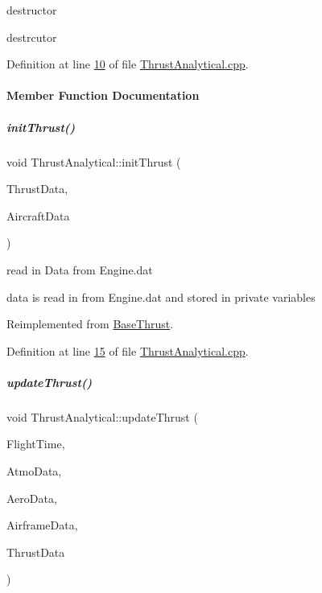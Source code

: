 destructor 

destrcutor 

Definition at line \hyperlink{_thrust_analytical_8cpp_source_l00010}{10} of file \hyperlink{_thrust_analytical_8cpp_source}{Thrust\+Analytical.\+cpp}.



\paragraph{Member Function Documentation}
\mbox{\label{group___engine_a5eb762aee5e5823fa34b2236d9b21134}} 
\subparagraph{\texorpdfstring{init\+Thrust()}{initThrust()}}
{\footnotesize\ttfamily void Thrust\+Analytical\+::init\+Thrust (\begin{DoxyParamCaption}\item[{Thrust\+Struct \&}]{Thrust\+Data,  }\item[{Aircraft\+Struct \&}]{Aircraft\+Data }\end{DoxyParamCaption})\hspace{0.3cm}{\ttfamily [virtual]}}



read in Data from Engine.\+dat 

data is read in from Engine.\+dat and stored in private variables 

Reimplemented from \hyperlink{group___engine_a02b3fe7f763d84c5d34b59f124eaf455}{Base\+Thrust}.



Definition at line \hyperlink{_thrust_analytical_8cpp_source_l00015}{15} of file \hyperlink{_thrust_analytical_8cpp_source}{Thrust\+Analytical.\+cpp}.

\mbox{\label{group___engine_a3907d6febaf711a225c0abfe8022304f}} 
\subparagraph{\texorpdfstring{update\+Thrust()}{updateThrust()}}
{\footnotesize\ttfamily void Thrust\+Analytical\+::update\+Thrust (\begin{DoxyParamCaption}\item[{\hyperlink{group___tools_ga3f1431cb9f76da10f59246d1d743dc2c}{Float64}}]{Flight\+Time,  }\item[{Atmosphere\+Struct \&}]{Atmo\+Data,  }\item[{Aerodynamic\+Struct \&}]{Aero\+Data,  }\item[{Airframe\+Struct \&}]{Airframe\+Data,  }\item[{Thrust\+Struct \&}]{Thrust\+Data }\end{DoxyParamCaption})\hspace{0.3cm}{\ttfamily [virtual]}}



